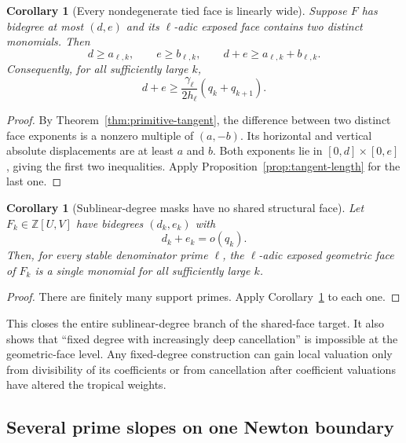 \documentclass[11pt,oneside]{article}
\newtheorem{corollary}[theorem]{Corollary}
\theoremstyle{definition}
\theoremstyle{remark}
\newcommand{\Z}{\mathbb Z}
\begin{document}
\begin{corollary}[Every nondegenerate tied face is linearly wide]
\label{cor:face-width}
Suppose $F$ has bidegree at most $(d,e)$ and its $\ell$-adic exposed face contains two
distinct monomials.  Then
\begin{equation}
 d\ge a_{\ell,k},
 \qquad e\ge b_{\ell,k},
 \qquad d+e\ge a_{\ell,k}+b_{\ell,k}.
 \label{eq:face-width}
\end{equation}
Consequently, for all sufficiently large $k$,
\begin{equation}
 d+e\ge
 \frac{\gamma_\ell}{2h_\ell}(q_k+q_{k+1}).
 \label{eq:linear-degree-tax}
\end{equation}
\end{corollary}

\begin{proof}
By Theorem~\ref{thm:primitive-tangent}, the difference between two distinct face exponents
is a nonzero multiple of $(a,-b)$.  Its horizontal and vertical absolute displacements are
at least $a$ and $b$.  Both exponents lie in $[0,d]\times[0,e]$, giving the first two
inequalities.  Apply Proposition~\ref{prop:tangent-length} for the last one.
\end{proof}

\begin{corollary}[Sublinear-degree masks have no shared structural face]
\label{cor:sublinear-no-face}
Let $F_k\in\Z[U,V]$ have bidegrees $(d_k,e_k)$ with
\begin{equation}
 d_k+e_k=o(q_k).
 \label{eq:sublinear-degree}
\end{equation}
Then, for every stable denominator prime $\ell$, the $\ell$-adic exposed geometric face of
$F_k$ is a single monomial for all sufficiently large $k$.
\end{corollary}

\begin{proof}
There are finitely many support primes.  Apply Corollary~\ref{cor:face-width} to each one.
\end{proof}

This closes the entire sublinear-degree branch of the shared-face target.  It also shows that
``fixed degree with increasingly deep cancellation'' is impossible at the geometric-face
level.  Any fixed-degree construction can gain local valuation only from divisibility of its
coefficients or from cancellation after coefficient valuations have altered the tropical
weights.

\subsection{Several prime slopes on one Newton boundary}
\end{document}
